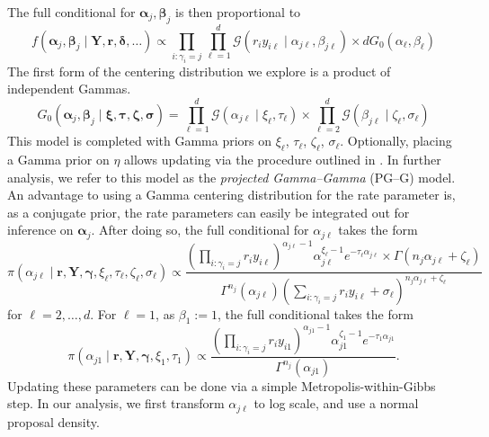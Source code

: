 The full conditional for $\bm{\alpha}_j,\bm{\beta}_j$ is then proportional to
\begin{equation}
    f(\bm{\alpha}_j,\bm{\beta}_j\mid \bm{Y},\bm{r},\bm{\delta},\ldots) \propto \prod_{i:\gamma_i = j}\prod_{\ell = 1}^d\mathcal{G}\left(r_iy_{i\ell}\mid\alpha_{j\ell},\beta_{j\ell}\right) \times dG_0(\alpha_{\ell},\beta_{\ell})
\end{equation}
The first form of the centering distribution we explore is a product of independent Gammas.
\begin{equation}
    G_0(\bm{\alpha}_j,\bm{\beta}_j\mid \bm{\xi},\bm{\tau},\bm{\zeta},\bm{\sigma}) = \prod_{\ell = 1}^d\mathcal{G}(\alpha_{j\ell}\mid \xi_{\ell},\tau_{\ell})\times\prod_{\ell = 2}^d\mathcal{G}(\beta_{j\ell}\mid\zeta_{\ell},\sigma_{\ell})
\end{equation}
This model is completed with Gamma priors on $\xi_{\ell}$, $\tau_{\ell}$, $\zeta_{\ell}$, $\sigma_{\ell}$.  Optionally, placing a Gamma prior on $\eta$ allows updating via the procedure outlined in \cite{escobar1995}.  In further analysis, we refer to this model as the \emph{projected Gamma--Gamma} (PG--G) model.  An advantage to using a Gamma centering distribution for the rate parameter is, as a conjugate prior, the rate parameters can easily be integrated out for inference on $\bm{\alpha}_j$.  After doing so, the full conditional for $\alpha_{j\ell}$ takes the form
\begin{equation}
    \pi(\alpha_{j\ell}\mid \bm{r},\bm{Y},\bm{\gamma},\xi_\ell,\tau_\ell,\zeta_\ell,\sigma_\ell) \propto \frac{\left(\prod_{i:\gamma_i = j}r_iy_{i\ell}\right)^{\alpha_{j\ell} - 1}\alpha_{j\ell}^{\xi_\ell - 1}e^{-\tau_\ell \alpha_{j\ell}}\times\Gamma\left(n_j\alpha_{j\ell} + \zeta_{\ell}\right)}{\Gamma^{n_j}(\alpha_{j\ell})\left(\sum_{i:\gamma_i = j}r_iy_{i\ell} + \sigma_{\ell}\right)^{n_j\alpha_{j\ell} + \zeta_{\ell}}}
\end{equation}
for $\ell = 2,\ldots,d$.  For $\ell = 1$, as $\beta_{1} := 1$, the full conditional takes the form
\begin{equation}
    \label{eqn:alpha1update}
    \pi(\alpha_{j1}\mid\bm{r},\bm{Y},\bm{\gamma},\xi_1,\tau_1) \propto \frac{\left(\prod_{i:\gamma_i = j}r_iy_{i1}\right)^{\alpha_{j1} - 1}\alpha_{j1}^{\zeta_1 - 1}e^{-\tau_1\alpha_{j1}}}{\Gamma^{n_j}(\alpha_{j1})}.
\end{equation}
Updating these parameters can be done via a simple Metropolis-within-Gibbs step.  In our analysis, we first transform $\alpha_{j\ell}$ to log scale, and use a normal proposal density.
